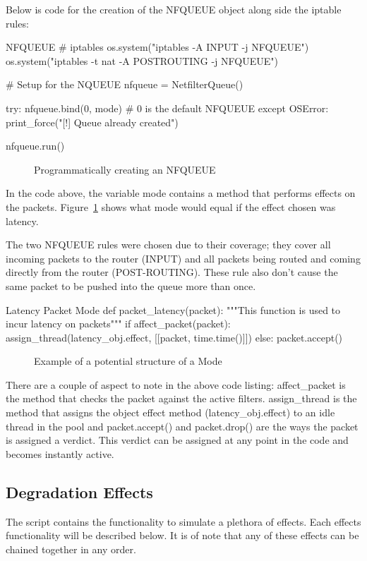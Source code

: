 Below is code for the creation of the NFQUEUE object along side the iptable rules:
\begin{Code}[]{NFQUEUE}
# iptables
os.system("iptables -A INPUT -j NFQUEUE")
os.system("iptables -t nat -A POSTROUTING -j NFQUEUE")

# Setup for the NQUEUE
nfqueue = NetfilterQueue()

try:
	nfqueue.bind(0, mode)  # 0 is the default NFQUEUE
except OSError:
	print_force("[!] Queue already created")
	
nfqueue.run()
\end{Code}
\begin{figure}[h]
	\caption{Programmatically creating an NFQUEUE}
\end{figure}

In the code above, the variable {\code mode} contains a method that performs effects on the packets. Figure~\ref{ref:latencyMode} shows what {\code mode} would equal if the effect chosen was latency.

The two NFQUEUE rules were chosen due to their coverage; they cover all incoming packets to the router (INPUT) and all packets being routed and coming directly from the router (POST-ROUTING). These rule also don't cause the same packet to be pushed into the queue more than once.

\begin{Code}{Latency Packet Mode}
def packet_latency(packet):
    """This function is used to incur latency on packets"""
    if affect_packet(packet):
        assign_thread(latency_obj.effect, [[packet, time.time()]])
    else:
        packet.accept()
\end{Code}
\begin{figure}[h]
	\caption{Example of a potential structure of a {\code Mode}}
	\label{ref:latencyMode}
\end{figure}

There are a couple of aspect to note in the above code listing:
{\code affect\_packet} is the method that checks the packet against the active filters. 
{\code assign\_thread} is the method that assigns the object effect method ({\code latency\_obj.effect}) to an idle thread in the pool and {\code packet.accept()} and {\code packet.drop()} are the ways the packet is assigned a verdict. This verdict can be assigned at any point in the code and becomes instantly active.

\clearpage
\subsection{Degradation Effects}
The script contains the functionality to simulate a plethora of effects. Each effects functionality will be described below. It is of note that any of these effects can be chained together in any order.

